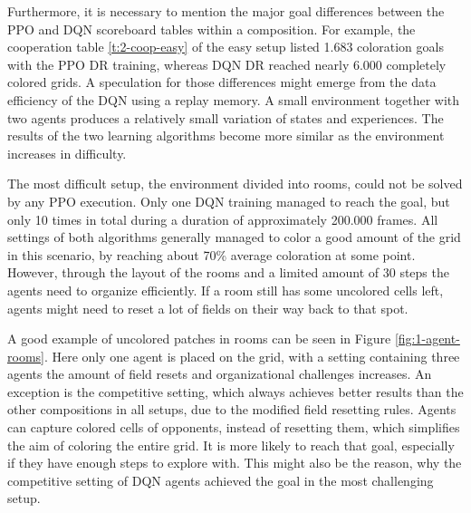 Furthermore, it is necessary to mention the major goal differences between the PPO and DQN scoreboard tables within a composition. For example, the cooperation table \ref{t:2-coop-easy} of the easy setup listed 1.683 coloration goals with the PPO DR training, whereas DQN DR reached nearly 6.000 completely colored grids. A speculation for those differences might emerge from the data efficiency of the DQN using a replay memory. A small environment together with two agents produces a relatively small variation of states and experiences. The results of the two learning algorithms become more similar as the environment increases in difficulty. 

The most difficult setup, the environment divided into rooms, could not be solved by any PPO execution. Only one DQN training managed to reach the goal, but only 10 times in total during a duration of approximately 200.000 frames. All settings of both algorithms generally managed to color a good amount of the grid in this scenario, by reaching about 70\% average coloration at some point. However, through the layout of the rooms and a limited amount of 30 steps the agents need to organize efficiently. If a room still has some uncolored cells left, agents might need to reset a lot of fields on their way back to that spot. 

A good example of uncolored patches in rooms can be seen in Figure \ref{fig:1-agent-rooms}. Here only one agent is placed on the grid, with a setting containing three agents the amount of field resets and organizational challenges increases. An exception is the competitive setting, which always achieves better results than the other compositions in all setups, due to the modified field resetting rules. Agents can capture colored cells of opponents, instead of resetting them, which simplifies the aim of coloring the entire grid. It is more likely to reach that goal, especially if they have enough steps to explore with. This might also be the reason, why the competitive setting of DQN agents achieved the goal in the most challenging setup. 